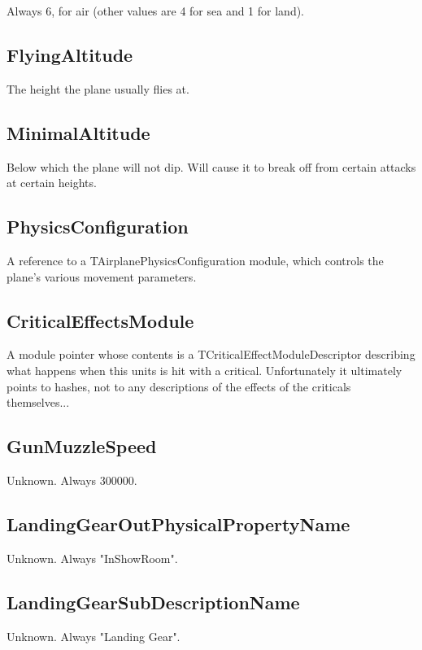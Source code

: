 \documentclass{article}
\begin{document}
Always 6, for air (other values are 4 for sea and 1 for land).

\subsection{FlyingAltitude}

The height the plane usually flies at.

\subsection{MinimalAltitude}

Below which the plane will not dip. Will cause it to break off from certain attacks at certain heights.

\subsection{PhysicsConfiguration}

A reference to a TAirplanePhysicsConfiguration module, which controls the plane's various movement parameters.

\subsection{CriticalEffectsModule}

A module pointer whose contents is a TCriticalEffectModuleDescriptor describing what happens when this units is hit with a critical. Unfortunately it ultimately points to hashes, not to any descriptions of the effects of the criticals themselves...

\subsection{GunMuzzleSpeed}

Unknown. Always 300000.

\subsection{LandingGearOutPhysicalPropertyName}

Unknown. Always "InShowRoom".

\subsection{LandingGearSubDescriptionName}

Unknown. Always "Landing Gear".
\end{document}
